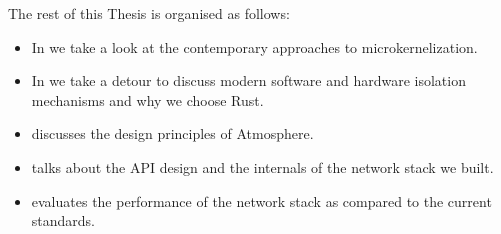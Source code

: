 The rest of this Thesis is organised as follows: 

\begin{itemize}
    \item{In  we take a look at the contemporary approaches to microkernelization. }
    \item{In  we take a detour to discuss modern software and hardware isolation mechanisms and why we choose Rust. }
    \item{ discusses the design principles of Atmosphere. }
    \item{ talks about the API design and the internals of the network stack we built. }
    \item{ evaluates the performance of the network stack as compared to the current standards. }
\end{itemize}
